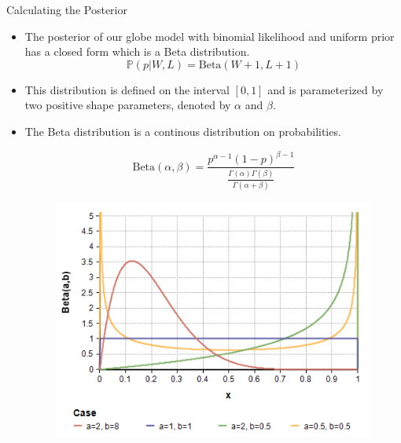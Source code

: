 \documentclass[handout]{beamer}
\begin{document}
\begin{frame}{Calculating the Posterior}
\scriptsize{

\begin{itemize}
\item The posterior of our globe model with binomial likelihood and uniform prior has a closed form which is a Beta distribution.
\begin{displaymath}
\mathbb{P}(p|W,L) = \text{Beta}(W+1 , L+1)
\end{displaymath}

\item This distribution is defined on the interval $[0, 1]$ and is parameterized by two positive shape parameters, denoted by $\alpha$ and $\beta$.

\item The Beta distribution is a continous distribution on probabilities.

\begin{displaymath}
\text{Beta}(\alpha,\beta)=\frac{p^{\alpha-1}(1-p)^{\beta-1}}{\frac{\Gamma(\alpha)\Gamma(\beta)}{\Gamma(\alpha + \beta)}}
\end{displaymath}

\begin{figure}[h!]
	\centering
	\includegraphics[scale=0.4]{pics/Beta(a,b).png}
\end{figure}

\end{itemize}

} 

\end{frame}
\end{document}
